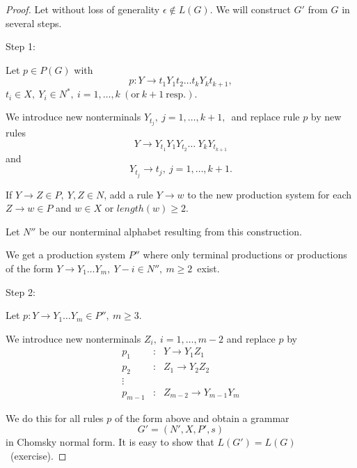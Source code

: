 \begin{proof}
Let without loss of generality $\epsilon \notin L(G)$. We will construct $G'$ from $G$ in several steps.

Step 1: 

Let $p \in P(G)$ with 
$$p: Y \rightarrow t_1 Y_1 t_2 \ldots t_k Y_k t_{k+1},$$
$t_i \in X,\ Y_i \in N^*,\ i=1,\ldots,k\ (\text{or}\ k+1\ \text{resp.}).$

We introduce new nonterminals $Y_{t_j},\ j = 1, \ldots, k+1,$\ and replace rule $p$ by new rules
$$Y \rightarrow Y_{t_1} Y_1 Y_{t_2} \ldots \ Y_k Y_{t_{k+1}}$$ and
$$Y_{t_j} \rightarrow t_j,\ j = 1, \ldots, k+1.$$

If $Y \rightarrow Z \in P,\ Y, Z \in N$, add a rule $Y \rightarrow w$ to the new production system for each $Z \rightarrow w \in P$ and $w \in X$ or $length(w) \geq 2$.

Let $N''$ be our nonterminal alphabet resulting from this construction.

We get a production system $P''$ where only terminal productions or productions of the form $Y \rightarrow Y_1 \ldots Y_m,\ Y-i \in N'',\ m \geq 2$\ exist.

Step 2:

Let $p: Y \rightarrow Y_1 \ldots Y_m \in P'',\ m \geq 3.$

We introduce new nonterminals $Z_i,\ i=1,\ldots,m-2$ and replace $p$ by
\begin{eqnarray*}
p_1 & : & Y \rightarrow Y_1 Z_1 \\
p_2 & : & Z_1 \rightarrow Y_2 Z_2 \\
\vdots \\
p_{m-1} & : & Z_{m-2} \rightarrow Y_{m-1} Y_m
\end{eqnarray*}

We do this for all rules $p$ of the form above and obtain a grammar
$$G' = (N', X, P', s)$$
in Chomsky normal form. It is easy to show that $L(G') = L(G)$\ (exercise). 
\end{proof}

   